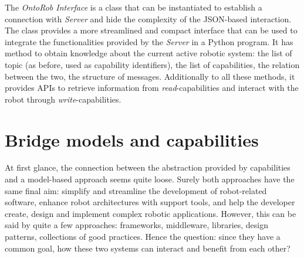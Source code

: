 The \textit{OntoRob Interface} is a class that can be instantiated to establish a connection with \textit{Server} and hide the complexity of the JSON-based interaction. The class provides a more streamlined and compact interface that can be used to integrate the functionalities provided by the \textit{Server} in a Python program. It has method to obtain knowledge about the current active robotic system: the list of topic (as before, used as capability identifiers), the list of capabilities, the relation between the two, the structure of messages. Additionally to all these methods, it provides APIs to retrieve information from \textit{read}-capabilities and interact with the robot through \textit{write}-capabilities.

\section{Bridge models and capabilities}
At first glance, the connection between the abstraction provided by capabilities and a model-based approach seems quite loose. Surely both approaches have the same final aim: simplify and streamline the development of robot-related software, enhance robot architectures with support tools, and help the developer create, design and implement complex robotic applications. However, this can be said by quite a few approaches: frameworks, middleware, libraries, design patterns, collections of good practices. Hence the question: since they have a common goal, how these two systems can interact and benefit from each other?


